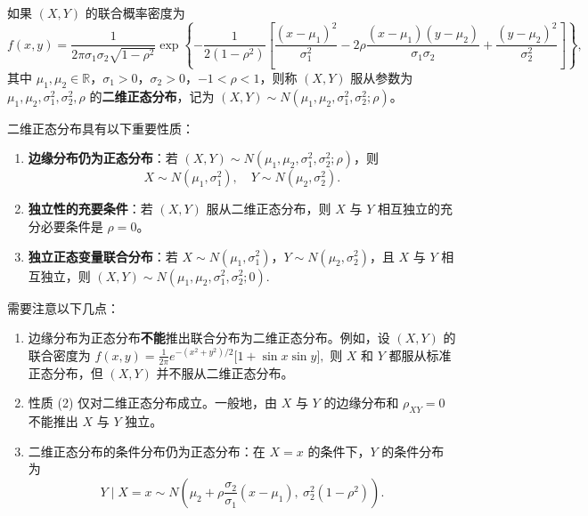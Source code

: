 \documentclass[lang=cn,11pt]{elegantbook}
\begin{document}
\begin{definition}[二维正态分布] \label{def:2d-normal}
如果 $(X,Y)$ 的联合概率密度为
\[
f(x,y) = \frac{1}{2\pi\sigma_1\sigma_2\sqrt{1-\rho^2}}\exp\left\{-\frac{1}{2(1-\rho^2)}\left[\frac{(x-\mu_1)^2}{\sigma_1^2} - 2\rho\frac{(x-\mu_1)(y-\mu_2)}{\sigma_1\sigma_2} + \frac{(y-\mu_2)^2}{\sigma_2^2}\right]\right\},
\]
其中 $\mu_1, \mu_2 \in \mathbb{R}$，$\sigma_1 > 0$，$\sigma_2 > 0$，$-1 < \rho < 1$，则称 $(X,Y)$ 服从参数为 $\mu_1, \mu_2, \sigma_1^2, \sigma_2^2, \rho$ 的\textbf{二维正态分布}，记为 $(X,Y) \sim N(\mu_1, \mu_2, \sigma_1^2, \sigma_2^2; \rho)$。
\end{definition}

\begin{property}\label{prop:2d-normal}
二维正态分布具有以下重要性质：
\begin{enumerate}
    \item \textbf{边缘分布仍为正态分布}：若 $(X,Y) \sim N(\mu_1, \mu_2, \sigma_1^2, \sigma_2^2; \rho)$，则
    \[
    X \sim N(\mu_1, \sigma_1^2), \quad Y \sim N(\mu_2, \sigma_2^2).
    \]
    \item \textbf{独立性的充要条件}：若 $(X,Y)$ 服从二维正态分布，则 $X$ 与 $Y$ 相互独立的充分必要条件是 $\rho = 0$。
    \item \textbf{独立正态变量联合分布}：若 $X \sim N(\mu_1, \sigma_1^2)$，$Y \sim N(\mu_2, \sigma_2^2)$，且 $X$ 与 $Y$ 相互独立，则
    \(
    (X,Y) \sim N(\mu_1, \mu_2, \sigma_1^2, \sigma_2^2; 0).
    \)
\end{enumerate}
\end{property}

\begin{note}
需要注意以下几点：
\begin{enumerate}
    \item 边缘分布为正态分布\textbf{不能}推出联合分布为二维正态分布。例如，设 $(X,Y)$ 的联合密度为
    \(
    f(x,y) = \frac{1}{2\pi}e^{-(x^2+y^2)/2}\bigl[1 + \sin x\sin y\bigr],
    \)
    则 $X$ 和 $Y$ 都服从标准正态分布，但 $(X,Y)$ 并不服从二维正态分布。
    \item 性质 (2) 仅对二维正态分布成立。一般地，由 $X$ 与 $Y$ 的边缘分布和 $\rho_{XY} = 0$ 不能推出 $X$ 与 $Y$ 独立。
    \item 二维正态分布的条件分布仍为正态分布：在 $X = x$ 的条件下，$Y$ 的条件分布为
    \[
    Y \mid X=x \sim N\!\left(\mu_2 + \rho\frac{\sigma_2}{\sigma_1}(x-\mu_1),\ \sigma_2^2(1-\rho^2)\right).
    \]
\end{enumerate}
\end{note}
\end{document}
